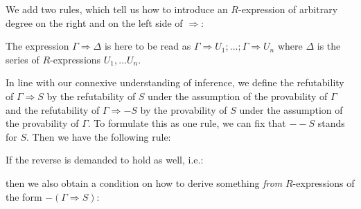 \documentclass{article}%
\theoremstyle{break}
\begin{document}
We add two rules, which tell us how to introduce an $R$-expression of arbitrary degree on the right and on the left side of $\Rightarrow$:

\begin{center}
\vspace{0.3cm}
\quad {}\quad\quad {}
\vspace{0.2cm}
\end{center}


\noindent The expression $\Gamma \Rightarrow \Delta$ is here to be read as  $\Gamma \Rightarrow U_1;...;\Gamma \Rightarrow U_n$ where $\Delta$ is the series of $R$-expressions $U_1,...U_n$.

\noindent In line with our connexive understanding of inference, we define the refutability of $\Gamma \Rightarrow S$ by the refutability of $S$ under the assumption of the provability of $\Gamma$ and the refutability of $\Gamma \Rightarrow -S$ by the provability of $S$ under the assumption of the provability of $\Gamma$.
To formulate this as one rule, we can fix that $--S$ stands for $S$.
Then we have the following rule:

\begin{center}
\vspace{0.3cm}
\quad{}
\vspace{0.2cm}
\end{center}


\noindent If the reverse is demanded to hold as well, i.e.:

\begin{center}
\vspace{0.2cm}
\quad{}
\vspace{0.2cm}
\end{center}


\noindent then we also obtain a condition on how to derive something \emph{from} $R$-expressions of the form $-(\Gamma \Rightarrow S)$:

\begin{center}
\vspace{0.2cm}
\quad{}
\vspace{0.2cm}
\end{center}
\end{document}
